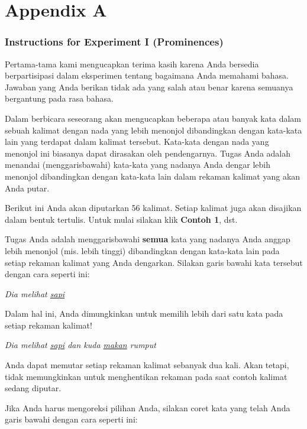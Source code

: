 \documentclass[output=paper
,modfonts
,nonflat]{langsci/langscibook}
\begin{document}
\section*{Appendix A}

\subsubsection*{\textbf{Instructions for Experiment I (Prominences)}}

Pertama-tama kami mengucapkan terima kasih karena Anda bersedia berpartisipasi da\-lam eksperimen tentang bagaimana Anda memahami bahasa. Jawaban yang Anda beri\-kan tidak ada yang salah atau benar karena semuanya bergantung pada rasa bahasa.

Dalam berbicara seseorang akan mengucapkan beberapa atau banyak kata dalam sebuah kalimat dengan nada yang lebih menonjol dibandingkan dengan kata-kata lain yang terdapat dalam kalimat tersebut. Kata-kata dengan nada yang menonjol ini bia\-sa\-nya dapat dirasakan oleh pendengarnya. Tugas Anda adalah menandai (menggarisbawahi) kata-kata yang nadanya Anda dengar lebih menonjol dibandingkan dengan kata-kata lain dalam rekaman kalimat yang akan Anda putar.

Berikut ini Anda akan diputarkan 56 kalimat. Setiap kalimat juga akan disajikan dalam bentuk tertulis. Untuk mulai silakan klik \textbf{Contoh 1}, dst.

Tugas Anda adalah menggarisbawahi \textbf{semua} kata yang nadanya Anda anggap lebih menonjol (mis. lebih tinggi) dibandingkan dengan kata-kata lain pada setiap rekaman kalimat yang Anda dengarkan. Silakan garis bawahi kata tersebut dengan cara seperti ini:

\begin{center}
\textit{Dia melihat \uline{sapi}}
\end{center}

\noindent
Dalam hal ini, Anda dimungkinkan untuk memilih lebih dari satu kata pada setiap rekaman kalimat! 

\begin{center}
\textit{Dia melihat \uline{sapi} dan kuda \uline{makan} rumput}
\end{center}

\noindent
Anda dapat memutar setiap rekaman kalimat sebanyak dua kali. Akan tetapi, tidak me\-mung\-kinkan untuk menghentikan rekaman pada saat contoh kalimat sedang diputar.

Jika Anda harus mengoreksi pilihan Anda, silakan coret kata yang telah Anda garis bawahi dengan cara seperti ini:
\end{document}
